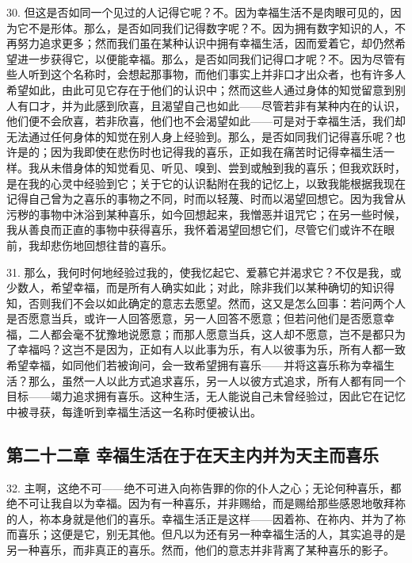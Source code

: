 30. 但这是否如同一个见过的人记得它呢？不。因为幸福生活不是肉眼可见的，因为它不是形体。那么，是否如同我们记得数字呢？不。因为拥有数字知识的人，不再努力追求更多；然而我们虽在某种认识中拥有幸福生活，因而爱着它，却仍然希望进一步获得它，以便能幸福。那么，是否如同我们记得口才呢？不。因为尽管有些人听到这个名称时，会想起那事物，而他们事实上并非口才出众者，也有许多人希望如此，由此可见它存在于他们的认识中；然而这些人通过身体的知觉留意到别人有口才，并为此感到欣喜，且渴望自己也如此——尽管若非有某种内在的认识，他们便不会欣喜，若非欣喜，他们也不会渴望如此——可是对于幸福生活，我们却无法通过任何身体的知觉在别人身上经验到。那么，是否如同我们记得喜乐呢？也许是的；因为我即使在悲伤时也记得我的喜乐，正如我在痛苦时记得幸福生活一样。我从未借身体的知觉看见、听见、嗅到、尝到或触到我的喜乐；但我欢跃时，是在我的心灵中经验到它；关于它的认识黏附在我的记忆上，以致我能根据我现在记得自己曾为之喜乐的事物之不同，时而以轻蔑、时而以渴望回想它。因为我曾从污秽的事物中沐浴到某种喜乐，如今回想起来，我憎恶并诅咒它；在另一些时候，我从善良而正直的事物中获得喜乐，我怀着渴望回想它们，尽管它们或许不在眼前，我却悲伤地回想往昔的喜乐。\par

31. 那么，我何时何地经验过我的，使我忆起它、爱慕它并渴求它？不仅是我，或少数人，希望幸福，而是所有人确实如此；对此，除非我们以某种确切的知识得知，否则我们不会以如此确定的意志去愿望。然而，这又是怎么回事：若问两个人是否愿意当兵，或许一人回答愿意，另一人回答不愿意；但若问他们是否愿意幸福，二人都会毫不犹豫地说愿意；而那人愿意当兵，这人却不愿意，岂不是都只为了幸福吗？这岂不是因为，正如有人以此事为乐，有人以彼事为乐，所有人都一致希望幸福，如同他们若被询问，会一致希望拥有喜乐——并将这喜乐称为幸福生活？那么，虽然一人以此方式追求喜乐，另一人以彼方式追求，所有人都有同一个目标——竭力追求拥有喜乐。这种生活，无人能说自己未曾经验过，因此它在记忆中被寻获，每逢听到幸福生活这一名称时便被认出。\par


\subsection{第二十二章 幸福生活在于在天主内并为天主而喜乐}

32. 主啊，这绝不可——绝不可进入向祢告罪的你的仆人之心；无论何种喜乐，都绝不可让我自以为幸福。因为有一种喜乐，并非赐给，而是赐给那些感恩地敬拜祢的人，祢本身就是他们的喜乐。幸福生活正是这样——因着祢、在祢内、并为了祢而喜乐；这便是它，别无其他。但凡以为还有另一种幸福生活的人，其实追寻的是另一种喜乐，而非真正的喜乐。然而，他们的意志并非背离了某种喜乐的影子。\par

